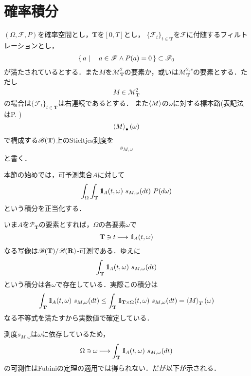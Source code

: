 \section{確率積分}
	$(\Omega,\mathscr{F},P)$を確率空間とし，$\mathbf{T}$を$[0,T]$とし，
	$\{\mathscr{F}_t\}_{t \in \mathbf{T}}$を$\mathscr{F}$に付随するフィルトレーションとし，
	\begin{align}
		\left\{\, a \mid \quad a \in \mathscr{F} \wedge P(a) = 0\, \right\} \subset \mathscr{F}_0
	\end{align}
	が満たされているとする．また$M$を$\mathscr{M}^2_{\mathbf{T}}$の要素か，或いは$\mathscr{M}^{2,c}_{\mathbf{T}}$の要素とする．ただし
	\begin{align}
		M \in \mathscr{M}^2_{\mathbf{T}}
	\end{align}
	の場合は$\{\mathscr{F}_t\}_{t \in \mathbf{T}}$は右連続であるとする．
	また$\inprod<M>$の$\omega$に対する標本路(表記法はP. \pageref{def:omega_to_path_mapping})
	\begin{align}
		\inprod<M>_\bullet(\omega)
	\end{align}
	で構成する$\mathscr{B}(\mathbf{T})$上のStieltjes測度を
	\begin{align}
		s_{M,\omega}
	\end{align}
	と書く．
	
	本節の始めでは，可予測集合$A$に対して
	\begin{align}
		\int_\Omega \int_{\mathbf{T}} \defunc_A(t,\omega)\ s_{M,\omega}(dt)\ P(d\omega)
	\end{align}
	という積分を正当化する．
	
	いま$A$を$\mathscr{P}_{\mathbf{T}}$の要素とすれば，$\Omega$の各要素$\omega$で
	\begin{align}
		\mathbf{T} \ni t \longmapsto \mbox{1}\hspace{-0.25em}\mbox{l}_A(t,\omega)
	\end{align}
	なる写像は$\mathscr{B}(\mathbf{T})/\mathscr{B}(\mathbf{R})$-可測である．ゆえに
	\begin{align}
		\int_{\mathbf{T}} \mbox{1}\hspace{-0.25em}\mbox{l}_A(t,\omega)\ s_{M,\omega}(dt)
	\end{align}
	という積分は各$\omega$で存在している．実際この積分は
	\begin{align}
		\int_{\mathbf{T}} \defunc_A(t,\omega)\ s_{M,\omega}(dt)
		\leq \int_{\mathbf{T}} \defunc_{\mathbf{T} \times \Omega}(t,\omega)\ s_{M,\omega}(dt)
		= \inprod<M>_T(\omega)
	\end{align}
	なる不等式を満たすから実数値で確定している．
	
	測度$s_{M,\omega}$は$\omega$に依存しているため，
	\begin{align}
		\Omega \ni \omega \longmapsto \int_{\mathbf{T}} \mbox{1}\hspace{-0.25em}\mbox{l}_A(t,\omega)\ s_{M,\omega}(dt)
	\end{align}
	の可測性はFubiniの定理の適用では得られない．だが以下が示される．
	
